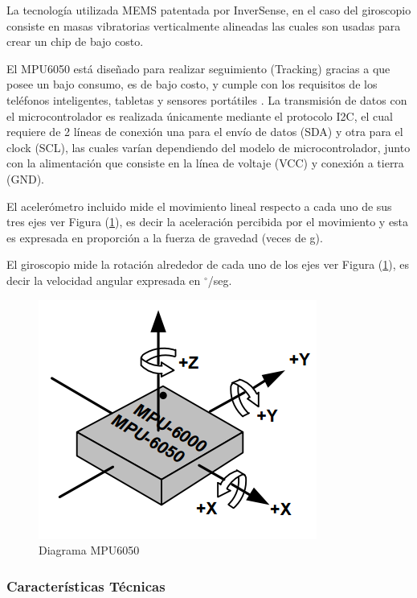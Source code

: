 \documentclass[12pt,a4paper]{article}
\newcommand{\grad}{$^{\circ}$}
\begin{document}
La tecnología utilizada MEMS patentada por InverSense, en el caso del giroscopio consiste en masas vibratorias verticalmente alineadas las cuales son usadas para crear un chip de bajo costo.

El MPU6050 está diseñado para realizar seguimiento (Tracking) gracias a que posee un bajo consumo, es de bajo costo, y cumple con los requisitos de los teléfonos inteligentes, tabletas y sensores portátiles \cite{MPU6050}.
La transmisión de datos con el microcontrolador es realizada únicamente mediante el protocolo I2C, el cual requiere de 2 líneas de conexión una para el envío de datos (SDA) y otra para el clock (SCL), las cuales varían dependiendo del modelo de microcontrolador, junto con la alimentación que consiste en la línea de voltaje (VCC) y conexión a tierra (GND).

El acelerómetro incluido mide el movimiento lineal respecto a cada uno de sus tres ejes ver Figura (\ref{fig:MPU6050}), es decir la aceleración percibida por el movimiento y esta es expresada en proporción a la fuerza de gravedad (veces de g).

El giroscopio mide la rotación alrededor de cada uno de los ejes ver Figura (\ref{fig:MPU6050}), es decir la velocidad angular expresada en \grad/seg.

\begin{figure}[H]
	\centering
	\includegraphics[scale=0.5]{images/MPU6050}
	\caption{Diagrama MPU6050}
	\label{fig:MPU6050}
\end{figure}

\subsubsection{Características Técnicas}
\end{document}
